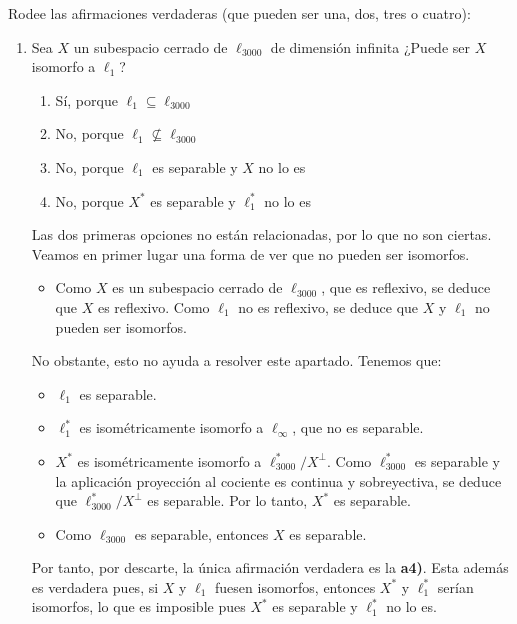 \documentclass[12pt]{article}
\begin{document}
    \begin{ejercicio}
        Rodee las afirmaciones verdaderas (que pueden ser una, dos, tres o cuatro):
        \begin{enumerate}[label=\alph*)]
            \item Sea $X$ un subespacio cerrado de $\ell_{3000}$ de dimensión infinita ¿Puede ser $X$ isomorfo a $\ell_1$?
            \begin{enumerate}[label={a\arabic*)}]
                \item Sí, porque $\ell_1 \subseteq \ell_{3000}$
                \item No, porque $\ell_1 \nsubseteq \ell_{3000}$
                \item No, porque $\ell_1$ es separable y $X$ no lo es
                \item No, porque $X^*$ es separable y $\ell_1^*$ no lo es
            \end{enumerate}

            Las dos primeras opciones no están relacionadas, por lo que no son ciertas. Veamos en primer lugar una forma de ver que no pueden ser isomorfos.
            \begin{itemize}
                \item Como $X$ es un subespacio cerrado de $\ell_{3000}$, que es reflexivo, se deduce que $X$ es reflexivo. Como $\ell_1$ no es reflexivo, se deduce que $X$ y $\ell_1$ no pueden ser isomorfos.
            \end{itemize}

            No obstante, esto no ayuda a resolver este apartado. Tenemos que:
            \begin{itemize}
                \item $\ell_1$ es separable.
                \item $\ell_{1}^*$ es isométricamente isomorfo a $\ell_\infty$, que no es separable.
                \item $X^*$ es isométricamente isomorfo a $\ell_{3000}^*/X^\perp$. Como $\ell_{3000}^*$ es separable y la aplicación proyección al cociente es continua y sobreyectiva, se deduce que $\ell_{3000}^*/X^\perp$ es separable. Por lo tanto, $X^*$ es separable.
                \item Como $\ell_{3000}$ es separable, entonces $X$ es separable.
            \end{itemize}

            Por tanto, por descarte, la única afirmación verdadera es la \textbf{a4)}. Esta además es verdadera pues, si $X$ y $\ell_1$ fuesen isomorfos, entonces $X^*$ y $\ell_1^*$ serían isomorfos, lo que es imposible pues $X^*$ es separable y $\ell_1^*$ no lo es.



\end{enumerate}
\end{ejercicio}
\end{document}

